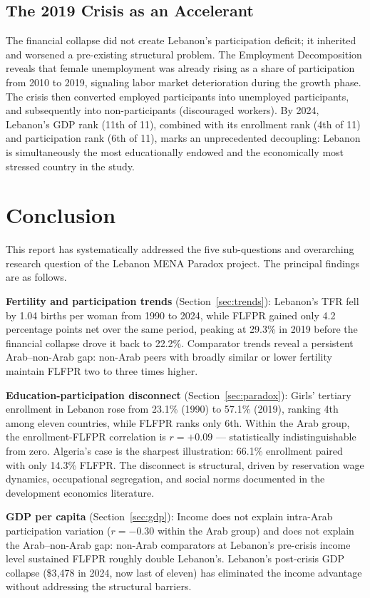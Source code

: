 \documentclass[12pt,a4paper]{article}
\begin{document}
\subsection{The 2019 Crisis as an Accelerant}

The financial collapse did not create Lebanon's participation deficit; it inherited and worsened a pre-existing structural problem. The Employment Decomposition reveals that female unemployment was already rising as a share of participation from 2010 to 2019, signaling labor market deterioration during the growth phase. The crisis then converted employed participants into unemployed participants, and subsequently into non-participants (discouraged workers). By 2024, Lebanon's GDP rank (11th of 11), combined with its enrollment rank (4th of 11) and participation rank (6th of 11), marks an unprecedented decoupling: Lebanon is simultaneously the most educationally endowed and the economically most stressed country in the study.

\section{Conclusion}
\label{sec:conclusion}

This report has systematically addressed the five sub-questions and overarching research question of the Lebanon MENA Paradox project. The principal findings are as follows.

\textbf{Fertility and participation trends} (Section~\ref{sec:trends}): Lebanon's TFR fell by 1.04 births per woman from 1990 to 2024, while FLFPR gained only 4.2 percentage points net over the same period, peaking at 29.3\% in 2019 before the financial collapse drove it back to 22.2\%. Comparator trends reveal a persistent Arab--non-Arab gap: non-Arab peers with broadly similar or lower fertility maintain FLFPR two to three times higher.

\textbf{Education-participation disconnect} (Section~\ref{sec:paradox}): Girls' tertiary enrollment in Lebanon rose from 23.1\% (1990) to 57.1\% (2019), ranking 4th among eleven countries, while FLFPR ranks only 6th. Within the Arab group, the enrollment-FLFPR correlation is $r = +0.09$ --- statistically indistinguishable from zero. Algeria's case is the sharpest illustration: 66.1\% enrollment paired with only 14.3\% FLFPR. The disconnect is structural, driven by reservation wage dynamics, occupational segregation, and social norms documented in the development economics literature.

\textbf{GDP per capita} (Section~\ref{sec:gdp}): Income does not explain intra-Arab participation variation ($r = -0.30$ within the Arab group) and does not explain the Arab--non-Arab gap: non-Arab comparators at Lebanon's pre-crisis income level sustained FLFPR roughly double Lebanon's. Lebanon's post-crisis GDP collapse (\$3{,}478 in 2024, now last of eleven) has eliminated the income advantage without addressing the structural barriers.
\end{document}
